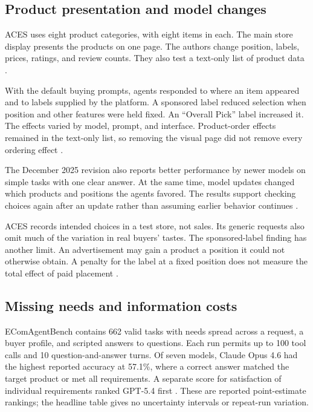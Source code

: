 \documentclass{article}
\begin{document}
\subsection{Product presentation and model changes}

ACES uses eight product categories, with eight items in each. The main store display presents the products on one page. The authors change position, labels, prices, ratings, and review counts. They also test a text-only list of product data \cite{ref17}.

With the default buying prompts, agents responded to where an item appeared and to labels supplied by the platform. A sponsored label reduced selection when position and other features were held fixed. An ``Overall Pick'' label increased it. The effects varied by model, prompt, and interface. Product-order effects remained in the text-only list, so removing the visual page did not remove every ordering effect \cite{ref17}.

The December 2025 revision also reports better performance by newer models on simple tasks with one clear answer. At the same time, model updates changed which products and positions the agents favored. The results support checking choices again after an update rather than assuming earlier behavior continues \cite{ref17}.

ACES records intended choices in a test store, not sales. Its generic requests also omit much of the variation in real buyers' tastes. The sponsored-label finding has another limit. An advertisement may gain a product a position it could not otherwise obtain. A penalty for the label at a fixed position does not measure the total effect of paid placement \cite{ref17}.

\subsection{Missing needs and information costs}

EComAgentBench contains 662 valid tasks with needs spread across a request, a buyer profile, and scripted answers to questions. Each run permits up to 100 tool calls and 10 question-and-answer turns. Of seven models, Claude Opus 4.6 had the highest reported accuracy at 57.1\%, where a correct answer matched the target product or met all requirements. A separate score for satisfaction of individual requirements ranked GPT-5.4 first \cite{ref18}. These are reported point-estimate rankings; the headline table gives no uncertainty intervals or repeat-run variation.
\end{document}

